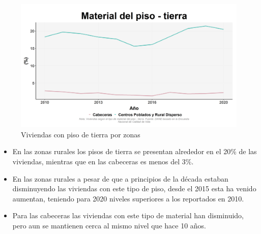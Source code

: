     \begin{figure}[H]
        \caption{Viviendas con piso de tierra por zonas \label{map_result_2} }
        \begin{center}
        \includegraphics[width=\textwidth,keepaspectratio]{img/var_180_trend.png}
        \end{center}
    \end{figure}
            \begin{itemize}
                    \item En las zonas rurales los pisos de tierra se presentan alrededor en el 20\% de las viviendas, mientras que en las cabeceras es menos del 3\%.
                    \item En las zonas rurales a pesar de que a principios de la década estaban disminuyendo las viviendas con este tipo de piso, desde el 2015 esta ha venido aumentan, teniendo para 2020 niveles superiores a los reportados en 2010.
                    \item Para las cabeceras las viviendas con este tipo de material han disminuido, pero aun se mantienen cerca al mismo nivel que hace 10 años.
                    \end{itemize}

